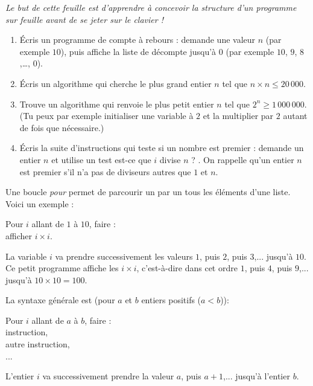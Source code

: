 \documentclass[class=report,crop=false, 12pt]{standalone}
\begin{document}

\emph{Le but de cette feuille est d'apprendre à concevoir la structure d'un programme sur feuille avant de se jeter sur le clavier !}

\bigskip
\bigskip

\begin{activite}
\sauteligne
\begin{enumerate} 
  \item Écris un programme de compte à rebours : demande une valeur $n$ (par exemple $10$), puis affiche la liste
  de décompte jusqu'à $0$ (par exemple $10$, $9$, $8$,\ldots, $0$).
  
  \item Écris un algorithme qui cherche le plus grand entier $n$ tel que $n \times n \le  20\,000$.
 
  \item Trouve un algorithme qui renvoie le plus petit entier $n$ tel que $2^n \ge 1\,000\,000$. (Tu peux par exemple initialiser une variable à $2$ et la multiplier par $2$ autant de fois que nécessaire.)
  
  \item Écris la suite d'instructions qui teste si un nombre est premier : demande un entier $n$ et utilise un test \og est-ce que $i$ divise $n$ ? \fg{}.
  On rappelle qu'un entier $n$ est premier s'il n'a pas de diviseurs autres que $1$ et $n$.
  
\end{enumerate}

\end{activite}


\bigskip


Une boucle \emph{pour} permet de parcourir un par un tous les éléments d'une liste.
Voici un exemple :
\begin{center}
\begin{minipage}{0.4\textwidth}
Pour $i$ allant de $1$ à $10$, faire :\\
\indentation afficher $i \times i$.
\end{minipage}
\end{center}
La variable $i$ va prendre successivement les valeurs $1$, puis $2$, puis $3$,... jusqu'à $10$.
Ce petit programme affiche les $i\times i$, c'est-à-dire dans cet ordre $1$, puis $4$, puis $9$,... jusqu'à $10 \times 10 = 100$. 


La syntaxe générale est (pour $a$ et $b$ entiers positifs ($a<b$)):
\begin{center}
\begin{minipage}{0.4\textwidth}
Pour $i$ allant de $a$ à $b$, faire :\\
\indentation instruction,\\
\indentation autre instruction,\\
\indentation ...\\
\end{minipage}
\end{center}
L'entier $i$ va successivement prendre la valeur $a$, puis $a+1$,... jusqu'à l'entier $b$.
\end{document}
